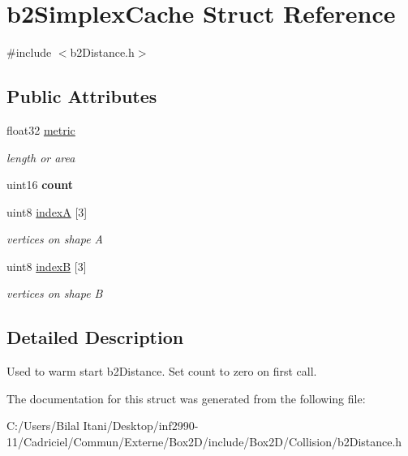 \hypertarget{structb2_simplex_cache}{}\section{b2\+Simplex\+Cache Struct Reference}
\label{structb2_simplex_cache}


{\ttfamily \#include $<$b2\+Distance.\+h$>$}

\subsection*{Public Attributes}
\begin{DoxyCompactItemize}
\item 
float32 \hyperlink{structb2_simplex_cache_a018e0a500b417d79bfed3f21310b15a2}{metric}\hypertarget{structb2_simplex_cache_a018e0a500b417d79bfed3f21310b15a2}{}\label{structb2_simplex_cache_a018e0a500b417d79bfed3f21310b15a2}

\begin{DoxyCompactList}\small\item\em length or area \end{DoxyCompactList}\item 
uint16 {\bfseries count}\hypertarget{structb2_simplex_cache_a5ef63839988cc06210ae76bcef96f56c}{}\label{structb2_simplex_cache_a5ef63839988cc06210ae76bcef96f56c}

\item 
uint8 \hyperlink{structb2_simplex_cache_ab574159e69dda7e14ead8de848ca6b67}{indexA} \mbox{[}3\mbox{]}\hypertarget{structb2_simplex_cache_ab574159e69dda7e14ead8de848ca6b67}{}\label{structb2_simplex_cache_ab574159e69dda7e14ead8de848ca6b67}

\begin{DoxyCompactList}\small\item\em vertices on shape A \end{DoxyCompactList}\item 
uint8 \hyperlink{structb2_simplex_cache_ab7586465ee2c5f7c3bdd8f80d5e256a7}{indexB} \mbox{[}3\mbox{]}\hypertarget{structb2_simplex_cache_ab7586465ee2c5f7c3bdd8f80d5e256a7}{}\label{structb2_simplex_cache_ab7586465ee2c5f7c3bdd8f80d5e256a7}

\begin{DoxyCompactList}\small\item\em vertices on shape B \end{DoxyCompactList}\end{DoxyCompactItemize}


\subsection{Detailed Description}
Used to warm start b2\+Distance. Set count to zero on first call. 

The documentation for this struct was generated from the following file\+:\begin{DoxyCompactItemize}
\item 
C\+:/\+Users/\+Bilal Itani/\+Desktop/inf2990-\/11/\+Cadriciel/\+Commun/\+Externe/\+Box2\+D/include/\+Box2\+D/\+Collision/b2\+Distance.\+h\end{DoxyCompactItemize}
